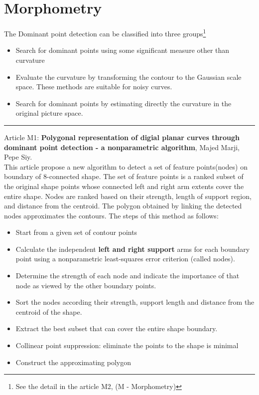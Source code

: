 \documentclass[12pt, a4paper]{report}
\begin{document}
\section*{Morphometry}
	The Dominant point detection can be classified into three groups\footnote{See the detail in the article M2, (M - Morphometry)}
	\begin{itemize}
		\item Search for dominant points using some significant measure other than curvature
		\item Evaluate the curvature by transforming the contour to the Gaussian scale space. These methods are suitable for noisy curves.
		\item Search for dominant points by estimating directly the curvature in the original picture space.
\end{itemize}	
\noindent\rule{16cm}{0.4pt}
	Article M1: \textbf{Polygonal representation of digial planar curves through dominant point detection - a nonparametric algorithm}, Majed Marji, Pepe Siy.\\[0.2cm]
	This article propose a new algorithm to detect a set of feature points(nodes) on boundary of 8-connected shape. The set of feature points is a ranked subset of the original shape points whose connected left and right arm extents cover the entire shape. Nodes are ranked based on their strength, length of support region, and distance from the centroid. The polygon obtained by linking the detected nodes approximates the contours. The steps of this method as follows:\\
	\begin{itemize}
		\item Start from a given set of contour points
		\item Calculate the independent \textbf{left and right support} arms for each boundary point using a nonparametric least-squares error criterion (called nodes).
		\item Determine the strength of each node and indicate the importance of that node as viewed by the other boundary points.
		\item Sort the nodes according their strength, support length and distance from the centroid of the shape.
		\item Extract the best subset that can cover the entire shape boundary.
		\item Collinear point suppression: eliminate the points to the shape is minimal
		\item Construct the approximating polygon
	\end{itemize}
\end{document}
